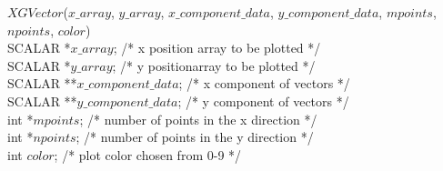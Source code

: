\begin{flushleft}
$XGVector$($x\_array$, $y\_array$, $x\_component\_data$,
$y\_component\_data$, $mpoints$, $npoints$, $color$) \\
SCALAR   *$x\_array$;    /* x position array to be plotted                         */ \\
SCALAR   *$y\_array$;    /* y positionarray to be plotted
*/ \\
SCALAR	**$x\_component\_data$;	/* x component of vectors	*/ \\
SCALAR	**$y\_component\_data$;	/* y component of vectors	*/ \\
int     *$mpoints$;    /* number of points in the x direction    */ \\
int     *$npoints$;    /* number of points in the y direction    */ \\
int      $color$;      /* plot color chosen from 0-9                   */
\end{flushleft}

